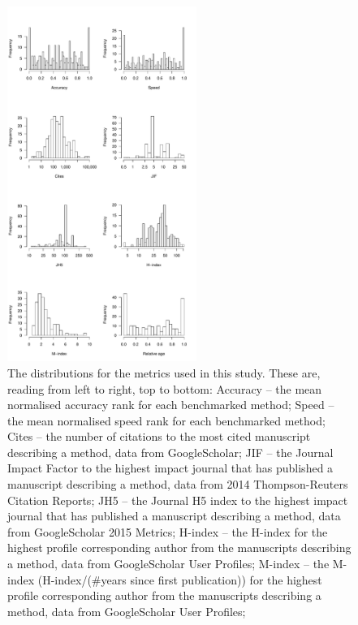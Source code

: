 \documentclass[fleqn,10pt]{SelfArx} %
\begin{document}
\clearpage
\newpage

\begin{figure}[H]
\centering
\includegraphics[width=0.55\textwidth]{supplementary-figures-small.pdf}
\caption{The distributions for the metrics used in this study. These
are, reading from left to right, top to bottom: Accuracy -- the mean
normalised accuracy rank for each benchmarked method; Speed -- the
mean normalised speed rank for each benchmarked method; Cites -- the number of
citations to the most cited manuscript describing a method, data from GoogleScholar;
JIF -- the Journal Impact Factor to the highest impact journal that has published
a manuscript describing a method, data from 2014 Thompson-Reuters Citation Reports;
JH5 -- the Journal H5 index to the highest impact journal that has published
a manuscript describing a method, data from GoogleScholar 2015 Metrics;
H-index -- the H-index for the highest profile corresponding author from the
manuscripts describing a method, data from GoogleScholar User Profiles;
M-index -- the M-index (H-index/(\#years since first publication)) for the
highest profile corresponding author from the manuscripts describing a method,
data from GoogleScholar User Profiles;}
\label{fig:S1}
\end{figure}
\end{document}
